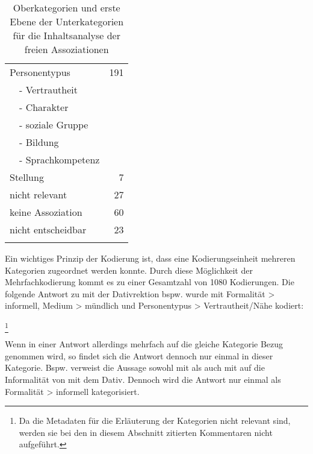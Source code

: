 \begin{table}
\begin{tabular}{llr}
\multicolumn{2}{l}{Personentypus} & 191 \\ %
\textbf{} & - Vertrautheit &  \\ 
\textbf{} & - Charakter &  \\ 
\textbf{} & - soziale Gruppe &  \\ 
\textbf{} & - Bildung &  \\ 
\textbf{} & - Sprachkompetenz &  \\ 
\multicolumn{2}{l}{Stellung} & 7 \\ 
\multicolumn{2}{l}{nicht relevant} & 27 \\ 
\multicolumn{2}{l}{keine Assoziation} & 60 \\ 
\multicolumn{2}{l}{nicht entscheidbar} & 23 \\ 
\lspbottomrule
\end{tabular}
\caption{Oberkategorien und erste Ebene der Unterkategorien für die Inhaltsanalyse der freien Assoziationen}
\label{table:KatsysAss}
\end{table}
Ein wichtiges Prinzip der Kodierung ist, dass eine Kodierungseinheit mehreren Kategorien zugeordnet werden konnte. 
Durch diese Möglichkeit der Mehrfachkodierung kommt es zu einer Gesamtzahl von 1080 Kodierungen. 
Die folgende Antwort zu \dank{} mit der Dativrektion bspw. wurde mit \glqq Formalität > informell\grqq, \glqq Medium > mündlich\grqq{} und \glqq Personentypus > Vertrautheit/Nähe\grqq{} kodiert: 
\begin{exe}
\ex {}\footnote{Da die Metadaten für die Erläuterung der Kategorien nicht relevant sind, werden sie bei den in diesem Abschnitt zitierten Kommentaren nicht aufgeführt.}
\end{exe}
Wenn in einer Antwort allerdings mehrfach auf die gleiche Kategorie Bezug genommen wird, so findet sich die Antwort dennoch nur einmal in dieser Kategorie. 
Bspw. verweist die Aussage  sowohl mit  als auch mit  auf die Informalität von \dank{} mit dem Dativ. 
Dennoch wird die Antwort nur einmal als \glqq Formalität > informell\grqq{} kategorisiert.

